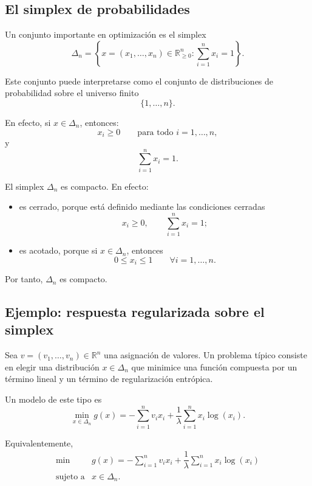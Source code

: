 \subsection{El simplex de probabilidades}

Un conjunto importante en optimización es el simplex
\[
    \Delta_n
    =
    \left\{
    x=(x_1,\dots,x_n)\in\mathbb{R}_{\geq 0}^n:
    \sum_{i=1}^{n}x_i=1
    \right\}.
\]

Este conjunto puede interpretarse como el conjunto de distribuciones de probabilidad sobre el universo finito
\[
    \{1,\dots,n\}.
\]

En efecto, si \(x\in\Delta_n\), entonces:
\[
    x_i\geq 0
    \qquad
    \text{para todo } i=1,\dots,n,
\]
y
\[
    \sum_{i=1}^{n}x_i=1.
\]

\begin{remark}
El simplex \(\Delta_n\) es compacto. En efecto:
\begin{itemize}
    \item es cerrado, porque está definido mediante las condiciones cerradas
    \[
        x_i\geq 0,
        \qquad
        \sum_{i=1}^{n}x_i=1;
    \]
    \item es acotado, porque si \(x\in\Delta_n\), entonces
    \[
        0\leq x_i\leq 1
        \qquad
        \forall i=1,\dots,n.
    \]
\end{itemize}
Por tanto, \(\Delta_n\) es compacto.
\end{remark}

\subsection{Ejemplo: respuesta regularizada sobre el simplex}

Sea \(v=(v_1,\dots,v_n)\in\mathbb{R}^n\) una asignación de valores. Un problema típico consiste en elegir una distribución \(x\in\Delta_n\) que minimice una función compuesta por un término lineal y un término de regularización entrópica.

Un modelo de este tipo es
\[
    \min_{x\in\Delta_n}
    g(x)
    =
    -\sum_{i=1}^{n}v_i x_i
    +
    \frac{1}{\lambda}
    \sum_{i=1}^{n}x_i\log(x_i).
\]

Equivalentemente,
\[
    \begin{array}{ll}
        \min & g(x)
        =
        -\displaystyle\sum_{i=1}^{n}v_i x_i
        +
        \dfrac{1}{\lambda}
        \displaystyle\sum_{i=1}^{n}x_i\log(x_i)
        \\[4mm]
        \text{sujeto a} & x\in \Delta_n.
    \end{array}
\]

